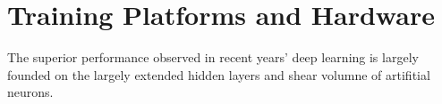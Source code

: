\section{Training Platforms and Hardware}
The superior performance observed in recent years' deep learning is largely founded on the largely extended hidden layers and shear volumne of artifitial neurons. 